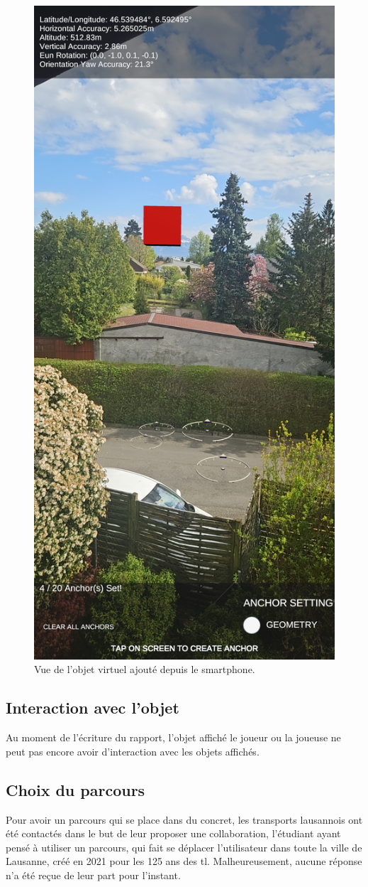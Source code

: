 \begin{figure}[H]
    \centering
    \includegraphics[width=0.5\linewidth]{assets/figures/Screenshots/geospatial example.jpg}
    \caption{Vue de l'objet virtuel ajouté depuis le smartphone.}
    \label{fig:GeoSample}
\end{figure}

\subsection{Interaction avec l'objet}
Au moment de l'écriture du rapport, l'objet affiché le joueur ou la joueuse ne peut pas encore avoir d'interaction avec les objets affichés.
\subsection{Choix du parcours}
Pour avoir un parcours qui se place dans du concret, les transports lausannois
ont été contactés dans le but de leur proposer une collaboration, l'étudiant ayant pensé à
utiliser un parcours, qui fait se déplacer l'utilisateur dans toute la ville de Lausanne,
créé en 2021 pour les 125 ans des tl.\cite{hatetVeriteLionsLausannois2021} Malheureusement, aucune réponse n'a été reçue de leur
part pour l'instant.

